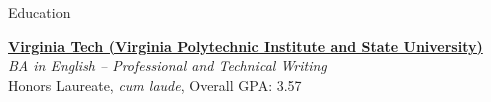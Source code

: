 \documentclass[11pt]{resume} %
\begin{document}

\begin{rSection}{Education}
	
	\textbf{\href{https://www.vt.edu/}{Virginia Tech (Virginia Polytechnic Institute and State University)}} \hfill {} \\ 
	\textit{BA in English – Professional and Technical Writing} \smallskip \\
\small	Honors Laureate, \textit{cum laude}, Overall GPA: 3.57
	
\end{rSection}

\end{document}
